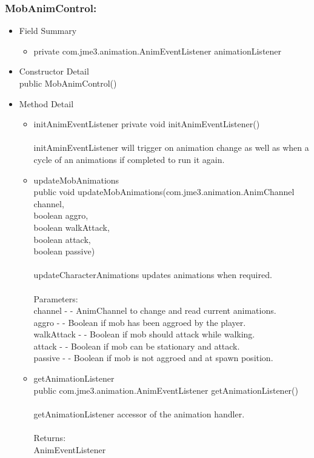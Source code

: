 \documentclass[letterpaper]{article}
\begin{document}
				\subsubsection*{MobAnimControl:}
				\vspace{0.1in}	
					\begin{itemize}
						\item	Field Summary
								\begin{itemize}
									\item	private com.jme3.animation.AnimEventListener	animationListener	
								\end{itemize}
						\item	Constructor Detail \\
								public MobAnimControl()
						\item	Method Detail
								\begin{itemize}
									\item	initAnimEventListener
											private void initAnimEventListener() \\ \\
											initAminEventListener will trigger on animation change as well as when a cycle of an animations if completed to run it again.
									\item	updateMobAnimations \\
											public void updateMobAnimations(com.jme3.animation.AnimChannel channel, \\
		                       boolean aggro, \\
		                       boolean walkAttack, \\
		                       boolean attack, \\
		                       boolean passive) \\ \\
											updateCharacterAnimations updates animations when required. \\ \\
											Parameters: \\
											channel - - AnimChannel to change and read current animations. \\
											aggro - - Boolean if mob has been aggroed by the player. \\
											walkAttack - - Boolean if mob should attack while walking. \\
											attack - - Boolean if mob can be stationary and attack. \\
											passive - - Boolean if mob is not aggroed and at spawn position.
									\item	getAnimationListener \\
											public com.jme3.animation.AnimEventListener getAnimationListener() \\ \\
											getAnimationListener accessor of the animation handler. \\ \\
											Returns: \\
											AnimEventListener
								\end{itemize}
					\end{itemize}
					
\end{document}
